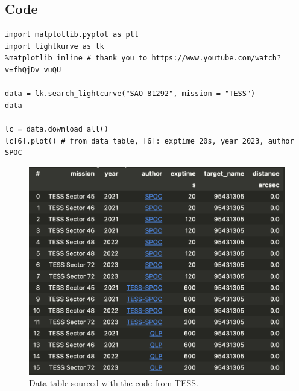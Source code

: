 \documentclass[12pt]{article}
\begin{document}
\subsection*{Code}

%

\begin{minipage}{\linewidth}
\captionsetup{hypcap=false}

\begin{mintedbox}
\begin{verbatim}
import matplotlib.pyplot as plt
import lightkurve as lk
%matplotlib inline # thank you to https://www.youtube.com/watch?v=fhQjDv_vuQU

data = lk.search_lightcurve("SAO 81292", mission = "TESS")
data

lc = data.download_all()
lc[6].plot() # from data table, [6]: exptime 20s, year 2023, author SPOC

\end{verbatim}
\end{mintedbox}

\end{minipage}

\begin{figure}[H]
    \centering
    \includegraphics[width=\textwidth]{SAO tess data.png}
    \caption*{\centering Data table sourced with the code from TESS.}
\end{figure}
\end{document}
